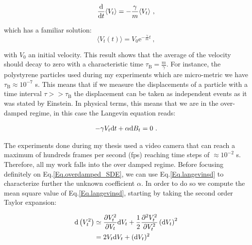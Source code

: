 \begin{equation}
	 \frac{ \textnormal{d}}{\textnormal{d}t}\langle V_t \rangle = - \frac{\gamma}{m} \langle V_t \rangle ~,
\end{equation}

which has a familiar solution:
\begin{equation}
	\langle V_t (t) \rangle =   V_0 \mathrm{e}^{-\frac{\gamma}{m} t}~,
	\label{Eq.int_V_langevin}
\end{equation}

with $V_0$ an initial velocity. This result shows that the average of the velocity should decay to zero with a characteristic time $\tau_\mathrm{B} = \frac{m}{\gamma}$. For instance, the polystyrene particles used during my experiments which are micro-metric we have $\tau_\mathrm{B} \approx 10^{-7}$ s. This means that if we measure the displacements of a particle with a time interval $ \tau  >> \tau _\mathrm{B} $ the displacement can be taken as independent events as it was stated by Einstein. In physical terms, this means that we are in the over-damped regime, in this case the Langevin equation reads:

\begin{equation}
	-\gamma V_t \textnormal{d}t  + \alpha  \textnormal{d}B_t = 0~.
	\label{Eq.overdamped_SDE}
\end{equation}

The experiments done during my thesis used a video camera that can reach a maximum of hundreds frames per second (\gls{fps}) reaching time steps of $\approx 10^{-2}$ s. Therefore, all my work falls into the over damped regime. Before focusing definitely on Eq.\ref{Eq.overdamped_SDE}, we can use Eq.\ref{Eq.langevinsd} to characterize further the unknown coefficient $\alpha$. In order to do so we compute the mean square value of Eq.\ref{Eq.langevinsd}, starting by taking the second order Taylor expansion:


\begin{equation}
	\begin{aligned}
	\textnormal{d}\left(V_t^2\right) &\simeq \frac{\partial V_t ^ 2}{\partial V_t} \textnormal{d} V_t + \frac{1}{2} \frac{\partial ^2 V_t^2}{\partial V_t ^2} \left( \textnormal{d}V_t \right)^2  \\
	& = 2 V_t \textnormal{d}V_t + (\textnormal{d}V_t)^2 \\	
	\end{aligned}
	\label{Eq.compute1}
\end{equation}

